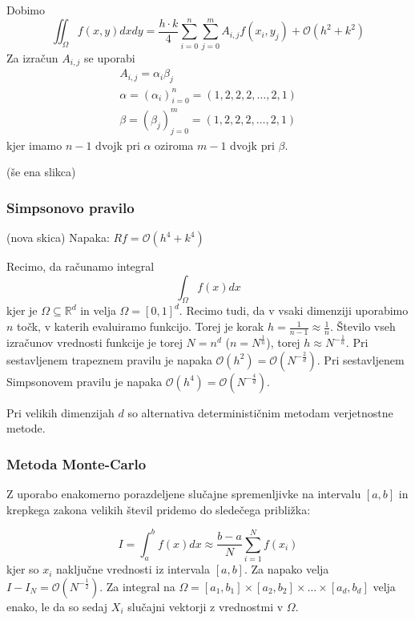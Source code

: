 \documentclass[a4paper,12pt]{article}
\theoremstyle{definition}
\theoremstyle{remark}
\newcommand{\R}{\mathbb{R}}
\begin{document}
Dobimo
\begin{equation*}
    \iint_{\Omega} f(x, y) dx dy = \frac{h \cdot k}{4} \sum_{i=0}^{n} \sum_{j=0}^{m} A_{i, j} f(x_i, y_j) + \mathcal{O}(h^2 + k^2)    
\end{equation*}
Za izračun $A_{i, j}$ se uporabi
\begin{gather*}
    A_{i, j} = \alpha_i \beta_j \\
    \alpha = (\alpha_i)_{i=0}^n = (1, 2, 2, 2, \dots, 2, 1) \\
    \beta = (\beta_j)_{j=0}^m = (1, 2, 2, 2, \dots, 2, 1)
\end{gather*}
kjer imamo $n-1$ dvojk pri $\alpha$ oziroma $m-1$ dvojk pri $\beta$.

(še ena slikca)

\subsubsection{Simpsonovo pravilo}
(nova skica)
Napaka: $Rf = \mathcal{O}(h^4 + k^4)$


Recimo, da računamo integral
\begin{equation*}
    \int_{\Omega} f(x) dx
\end{equation*}
kjer je $\Omega \subseteq \R^d$ in velja $\Omega = [0, 1]^d$. Recimo tudi, da v vsaki dimenziji uporabimo $n$ točk, v katerih evaluiramo funkcijo.
Torej je korak $h = \frac{1}{n-1} \approx \frac{1}{n}$. Število vseh izračunov vrednosti funkcije je torej $N = n^d$ ($n = N^{\frac{1}{n}}$), torej
$h \approx N^{-\frac{1}{n}}$. Pri sestavljenem trapeznem pravilu je napaka $\mathcal{O}(h^2) = \mathcal{O}(N^{-\frac{2}{d}})$. Pri sestavljenem Simpsonovem
pravilu je napaka $\mathcal{O}(h^4) = \mathcal{O}(N^{-\frac{4}{d}})$.

Pri velikih dimenzijah $d$ so alternativa determinističnim metodam verjetnostne metode.

\subsubsection{Metoda Monte-Carlo}
Z uporabo enakomerno porazdeljene slučajne spremenljivke na intervalu $[a, b]$ in krepkega zakona velikih števil pridemo do sledečega približka:

\begin{equation*}
    I = \int_{a}^{b} f(x) dx \approx \frac{b-a}{N} \sum_{i=1}^{N} f(x_i)
\end{equation*}
kjer so $x_i$ naključne vrednosti iz intervala $[a, b]$. Za napako velja $I - I_N = \mathcal{O}(N^{-\frac{1}{2}})$. Za integral na 
$\Omega = [a_1, b_1] \times [a_2, b_2] \times \dots \times [a_d, b_d]$ velja enako, le da so sedaj $X_i$ slučajni vektorji z vrednostmi v $\Omega$.
\end{document}
